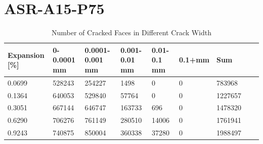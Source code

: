 \chapter{ASR-A15-P75}

\begin{table}[ht!]
  \caption{Number of Cracked Faces in Different Crack Width}
    \centering
    \begin{tabular}{| p{2.0cm} | p{1.6cm} | p{1.6cm} | p{1.6cm} | p{1.6cm} | p{1.6cm} | p{1.6cm} | p{1.6cm} | p{2.0cm} | }
    \hline

	Expansion [\%] & 0-0.0001 mm & 0.0001-0.001 mm & 0.001-0.01 mm & 0.01-0.1 mm & 0.1+mm & Sum \\ \hline

    0.0699 &	528243 &	254227 &	1498 &	0 &	0 &	783968 \\ \hline
    0.1364 &	640053 &	529840 &	57764 &	0 &	0 &	1227657 \\ \hline
    0.3051 &	667144 &	646747 &	163733 &	696 &	0 &	1478320\\ \hline
    0.6290 &	706276 &	761149 &	280510 &	14006 &	0 &	1761941\\ \hline
    0.9243 &	740875 &	850004 &	360338 &	37280 &	0 &	1988497\\ \hline

    \end{tabular}

    \label{}
\end{table}



